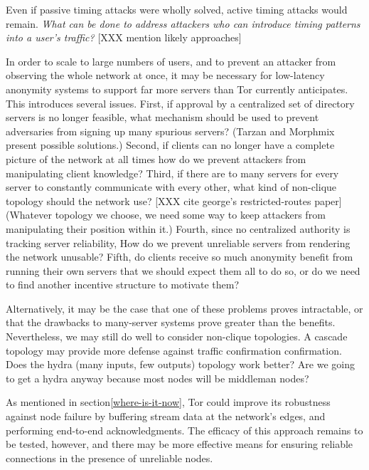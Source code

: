\documentclass[times,10pt,twocolumn]{article}
\begin{document}
Even if passive timing attacks were wholly solved, active timing
attacks would remain.  \emph{What can
  be done to address attackers who can introduce timing patterns into
  a user's traffic?}  [XXX mention likely approaches]

%

In order to scale to large numbers of users, and to prevent an
attacker from observing the whole network at once, it may be necessary
for low-latency anonymity systems to support far more servers than Tor
currently anticipates.  This introduces several issues.  First, if
approval by a centralized set of directory servers is no longer
feasible, what mechanism should be used to prevent adversaries from
signing up many spurious servers?  (Tarzan and Morphmix present
possible solutions.)  Second, if clients can no longer have a complete
picture of the network at all times how do we prevent attackers from
manipulating client knowledge?  Third, if there are to many servers
for every server to constantly communicate with every other, what kind
of non-clique topology should the network use?  [XXX cite george's
  restricted-routes paper] (Whatever topology we choose, we need some
way to keep attackers from manipulating their position within it.)
Fourth, since no centralized authority is tracking server reliability,
How do we prevent unreliable servers from rendering the network
unusable?  Fifth, do clients receive so much anonymity benefit from
running their own servers that we should expect them all to do so, or
do we need to find another incentive structure to motivate them?

Alternatively, it may be the case that one of these problems proves
intractable, or that the drawbacks to many-server systems prove
greater than the benefits.  Nevertheless, we may still do well to
consider non-clique topologies.  A cascade topology may provide more
defense against traffic confirmation confirmation.
Does the hydra (many inputs, few outputs) topology work
better? Are we going to get a hydra anyway because most nodes will be
middleman nodes?

%
As mentioned in section\ref{where-is-it-now}, Tor could improve its
robustness against node failure by buffering stream data at the
network's edges, and performing end-to-end acknowledgments.  The
efficacy of this approach remains to be tested, however, and there
may be more effective means for ensuring reliable connections in the
presence of unreliable nodes.
\end{document}
